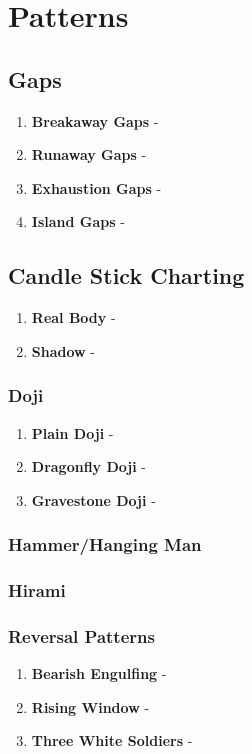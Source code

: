 \chapter{Patterns}

\section{Gaps}
\begin{enumerate}
\item \textbf{Breakaway Gaps} - 
\item \textbf{Runaway Gaps} - 
\item \textbf{Exhaustion Gaps} - 
\item \textbf{Island Gaps} - 
\end{enumerate}

\section{Candle Stick Charting}
\begin{enumerate}
\item \textbf{Real Body} - 
\item \textbf{Shadow} - 
\end{enumerate}
%
\subsection{Doji}
\begin{enumerate}
\item \textbf{Plain Doji} - 
\item \textbf{Dragonfly Doji} - 
\item \textbf{Gravestone Doji} - 
\end{enumerate}
%
\subsection{Hammer/Hanging Man}
%
\subsection{Hirami}
%
\subsection{Reversal Patterns}
\begin{enumerate}
\item \textbf{Bearish Engulfing} - 
\item \textbf{Rising Window} - 
\item \textbf{Three White Soldiers} - 
\end{enumerate}

